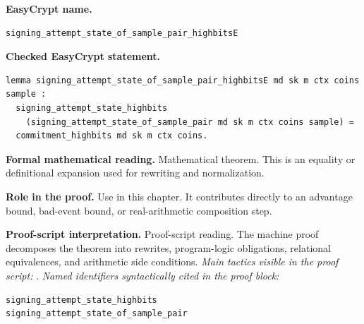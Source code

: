 \begin{formaltheorem}
\noindent\textbf{EasyCrypt name.}
\begin{lstlisting}[language=EasyCrypt,basicstyle=\ttfamily\scriptsize]
signing_attempt_state_of_sample_pair_highbitsE
\end{lstlisting}
\noindent\textbf{Checked EasyCrypt statement.}
\begin{lstlisting}[language=EasyCrypt,basicstyle=\ttfamily\scriptsize]
lemma signing_attempt_state_of_sample_pair_highbitsE md sk m ctx coins sample :
  signing_attempt_state_highbits
    (signing_attempt_state_of_sample_pair md sk m ctx coins sample) =
  commitment_highbits md sk m ctx coins.
\end{lstlisting}
\noindent\textbf{Formal mathematical reading.}
Mathematical theorem. This is an equality or definitional expansion used for rewriting and normalization.

\noindent\textbf{Role in the proof.}
Use in this chapter. It contributes directly to an advantage bound, bad-event bound, or real-arithmetic composition step.

\noindent\textbf{Proof-script interpretation.}
Proof-script reading. The machine proof decomposes the theorem into rewrites, program-logic obligations, relational equivalences, and arithmetic side conditions.
\emph{Main tactics visible in the proof script:} .
\emph{Named identifiers syntactically cited in the proof block:}
\begin{lstlisting}[language=EasyCrypt,basicstyle=\ttfamily\scriptsize]
signing_attempt_state_highbits
signing_attempt_state_of_sample_pair
\end{lstlisting}

\end{formaltheorem}

